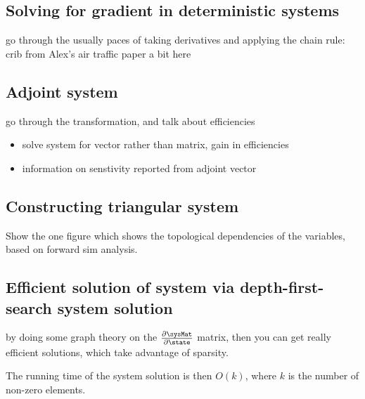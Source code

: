 \subsection{Solving for gradient in deterministic systems} %
\label{sub:solving_for_gradient_in_deterministic_systems}

go through the usually paces of taking derivatives and applying the chain rule: crib from Alex's air traffic paper a bit here


\subsection{Adjoint system} %
\label{sub:adjoint_system}

go through the transformation, and talk about efficiencies

\begin{itemize}
    \item solve system for vector rather than matrix, gain in efficiencies
    \item information on senstivity reported from adjoint vector
\end{itemize}



\subsection{Constructing triangular system} %
\label{sub:constructing_triangular_system}

Show the one figure which shows the topological dependencies of the variables, based on forward sim analysis.


\subsection{Efficient solution of system via depth-first-search system solution} %
\label{sub:efficient_solution_of_system_via_depth_first_search_system_solution}

by doing some graph theory on the $\dhdx$ matrix, then you can get really efficient solutions, which take advantage of sparsity.

The running time of the system solution is then $O\left(k\right)$, where $k$ is the number of non-zero elements.

